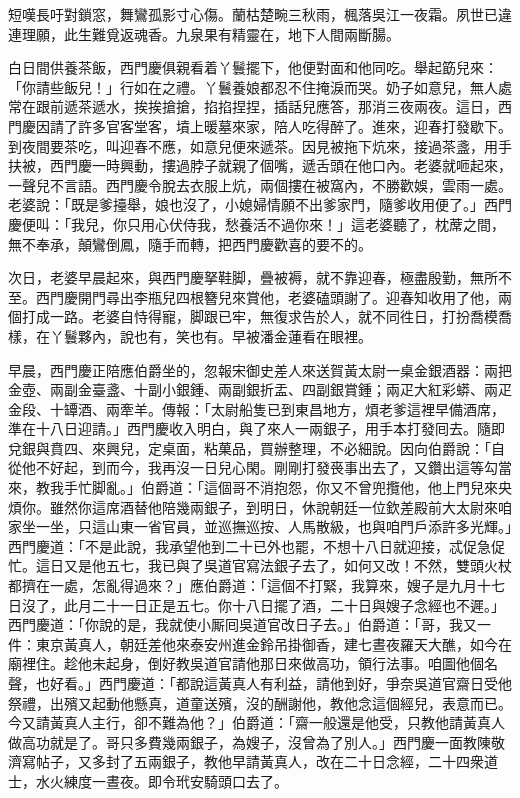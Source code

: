 短嘆長吁對鎖窓，舞鸞孤影寸心傷。蘭枯楚畹三秋雨，楓落吳江一夜霜。夙世已違連理願，此生難覓返魂香。九泉果有精靈在，地下人間兩斷腸。

白日間供養茶飯，西門慶俱親看着丫鬟擺下，他便對面和他同吃。舉起筯兒來：「你請些飯兒！」{}行如在之禮。丫鬟養娘都忍不住掩淚而哭。奶子如意兒，無人處常在跟前遞茶遞水，挨挨搶搶，掐掐捏捏，插話兒應答，那消三夜兩夜。{}這日，西門慶因請了許多官客堂客，墳上暖墓來家，陪人吃得醉了。進來，迎春打發歇下。到夜間要茶吃，叫迎春不應，如意兒便來遞茶。因見被拖下炕來，接過茶盞，用手扶被，西門慶一時興動，摟過脖子就親了個嘴，遞舌頭在他口內。老婆就咂起來，一聲兒不言語。西門慶令脫去衣服上炕，兩個摟在被窩內，不勝歡娛，雲雨一處。老婆說：「既是爹擡舉，娘也沒了，小媳婦情願不出爹家門，隨爹收用便了。」西門慶便叫：「我兒，你只用心伏侍我，愁養活不過你來！」這老婆聽了，枕蓆之間，無不奉承，顛鸞倒鳳，隨手而轉，{}把西門慶歡喜的要不的。

次日，老婆早晨起來，與西門慶拏鞋脚，疊被褥，就不靠迎春，極盡殷勤，無所不至。西門慶開門尋出李瓶兒四根簪兒來賞他，老婆磕頭謝了。迎春知收用了他，兩個打成一路。老婆自恃得寵，脚跟已牢，無復求告於人，就不同徃日，打扮喬模喬樣，在丫鬟夥內，說也有，笑也有。{}早被潘金蓮看在眼裡。

早晨，西門慶正陪應伯爵坐的，忽報宋御史差人來送賀黃太尉一桌金銀酒器：兩把金壺、兩副金臺盞、十副小銀鍾、兩副銀折盂、四副銀賞鍾；兩疋大紅彩蟒、兩疋金段、十罈酒、兩牽羊。傳報：「太尉船隻已到東昌地方，煩老爹這裡早備酒席，準在十八日迎請。」西門慶收入明白，與了來人一兩銀子，用手本打發囘去。隨即兌銀與賁四、來興兒，定桌面，粘菓品，買辦整理，不必細說。因向伯爵說：「自從他不好起，到而今，我再沒一日兒心閑。剛剛打發䘮事出去了，又鑽出這等勾當來，教我手忙脚亂。」{}伯爵道：「這個哥不消抱怨，你又不曾兜攬他，他上門兒來央煩你。雖然你這席酒替他陪幾兩銀子，到明日，休說朝廷一位欽差殿前大太尉來咱家坐一坐，只這山東一省官員，並巡撫巡按、人馬散級，也與咱門戶添許多光輝。」{}西門慶道：「不是此說，我承望他到二十已外也罷，不想十八日就迎接，忒促急促忙。這日又是他五七，我已與了吳道官寫法銀子去了，如何又改！不然，雙頭火杖都擠在一處，怎亂得過來？」應伯爵道：「這個不打緊，我算來，嫂子是九月十七日沒了，此月二十一日正是五七。你十八日擺了酒，二十日與嫂子念經也不遲。」西門慶道：「你說的是，我就使小厮囘吳道官改日子去。」伯爵道：「哥，我又一件：東京黃真人，朝廷差他來泰安州進金鈴吊掛御香，建七晝夜羅天大醮，如今在廟裡住。趁他未起身，倒好教吳道官請他那日來做高功，領行法事。咱圖他個名聲，也好看。」{}西門慶道：「都說這黃真人有利益，{}請他到好，爭奈吳道官齋日受他祭禮，出殯又起動他懸真，道童送殯，沒的酬謝他，教他念這個經兒，表意而已。今又請黃真人主行，卻不難為他？」伯爵道：「齋一般還是他受，只教他請黃真人做高功就是了。哥只多費幾兩銀子，為嫂子，沒曾為了別人。」{}西門慶一面教陳敬濟寫帖子，又多封了五兩銀子，教他早請黃真人，改在二十日念經，二十四衆道士，水火練度一晝夜。即令玳安騎頭口去了。

